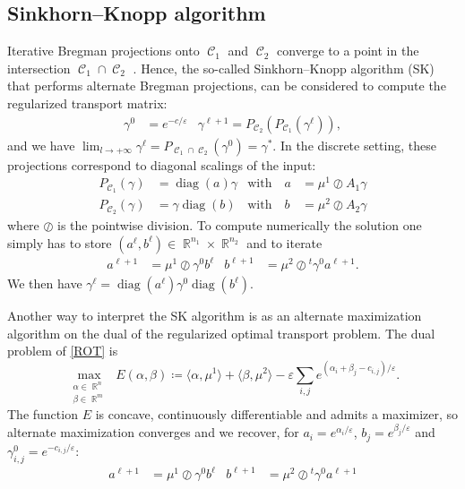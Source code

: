 \documentclass{article} %
\DeclareMathOperator{\IR}{\mathbb{R}}
\DeclareMathOperator{\Ccal}{\mathcal{C}}
\DeclareMathOperator{\diag}{diag}
\renewcommand{\epsilon}{\varepsilon}
\theoremstyle{plain}
\theoremstyle{definition}
\theoremstyle{remark}
\begin{document}
\subsection{Sinkhorn--Knopp algorithm}
Iterative Bregman projections onto $\Ccal_1$ and $\Ccal_2$ converge to a point in the intersection $\Ccal_1 \cap \Ccal_2$ \cite{bregman67}. Hence, the so-called Sinkhorn--Knopp algorithm (SK) \cite{sinkhorn64} that performs alternate Bregman projections, can be considered to compute the regularized  transport matrix:
\begin{align*}
\gamma^0 &= e^{-c/\epsilon} &
\gamma^{\ell+1} = P_{\Ccal_2}(P_{\Ccal_1}(\gamma^{\ell})),
\end{align*}
and we have 
$\lim_{l\rightarrow +\infty} \gamma^{\ell} = P_{\Ccal_1 \cap \Ccal_2}(\gamma^0) = \gamma^*.$
%
In the discrete setting, these projections correspond to diagonal scalings of the input:
\begin{align}\label{scaling}
P_{\Ccal_1}(\gamma) &= \diag(a) \gamma &\text{with}\quad
a &=  {\mu^1}\oslash{A_1 \gamma} \\
P_{\Ccal_2}(\gamma) &= \gamma \diag(b) &\text{with}\quad
b &= {\mu^2}\oslash{A_2 \gamma}\nonumber
\end{align}
where $\oslash$ is the pointwise division. 
To compute numerically the solution one simply has to store $(a^{\ell}, b^{\ell})\in\IR^{n_1}\times \IR^{n_2}$ and to iterate
\begin{align*}
a^{\ell+1} &= {\mu^1}\oslash{\gamma^0 b^{\ell}} &
b^{\ell+1} &= {\mu^2}\oslash{^t \gamma^0 a^{\ell+1}} .
\end{align*}
We then have $\gamma^{\ell} = \diag(a^{\ell}) \gamma^0 \diag(b^{\ell}).$ 

Another way to interpret the SK algorithm is as an alternate maximization algorithm on the dual of the regularized optimal transport problem. The dual problem of \eqref{ROT} is
\begin{equation}\label{DROT}
\max_{\substack{\alpha\in \IR^n\\\beta\in \IR^m}}\; E(\alpha,\beta) \coloneqq \langle \alpha,\mu^1\rangle+\langle \beta,\mu^2\rangle-\epsilon\sum_{i,j}e^{(\alpha_i+\beta_j-c_{i,j})/\epsilon}.
\end{equation}
The function $E$ is concave, continuously differentiable and admits a maximizer, so alternate maximization converges and we recover, for $a_i=e^{\alpha_i/\epsilon}$, $b_j=e^{\beta_j/\epsilon}$ and $\gamma^0_{i,j}=e^{-c_{i,j}/\epsilon}$:
\begin{align*}
a^{\ell+1} &= {\mu^1}\oslash{\gamma^0 b^{\ell}} &
b^{\ell+1} &= {\mu^2}\oslash{^t \gamma^0 a^{\ell+1}} 
\end{align*}
\end{document}
